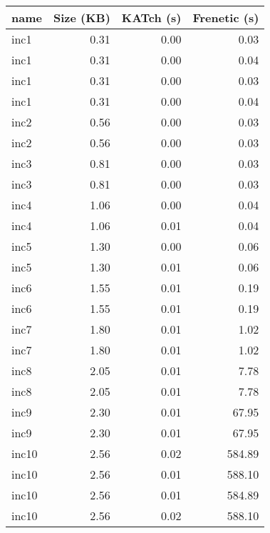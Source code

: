 \begin{tabular}{lrrr}
\toprule
name & Size (KB) & KATch (s) & Frenetic (s) \\
\midrule
inc1 & 0.31 & 0.00 & 0.03 \\
inc1 & 0.31 & 0.00 & 0.04 \\
inc1 & 0.31 & 0.00 & 0.03 \\
inc1 & 0.31 & 0.00 & 0.04 \\
inc2 & 0.56 & 0.00 & 0.03 \\
inc2 & 0.56 & 0.00 & 0.03 \\
inc3 & 0.81 & 0.00 & 0.03 \\
inc3 & 0.81 & 0.00 & 0.03 \\
inc4 & 1.06 & 0.00 & 0.04 \\
inc4 & 1.06 & 0.01 & 0.04 \\
inc5 & 1.30 & 0.00 & 0.06 \\
inc5 & 1.30 & 0.01 & 0.06 \\
inc6 & 1.55 & 0.01 & 0.19 \\
inc6 & 1.55 & 0.01 & 0.19 \\
inc7 & 1.80 & 0.01 & 1.02 \\
inc7 & 1.80 & 0.01 & 1.02 \\
inc8 & 2.05 & 0.01 & 7.78 \\
inc8 & 2.05 & 0.01 & 7.78 \\
inc9 & 2.30 & 0.01 & 67.95 \\
inc9 & 2.30 & 0.01 & 67.95 \\
inc10 & 2.56 & 0.02 & 584.89 \\
inc10 & 2.56 & 0.01 & 588.10 \\
inc10 & 2.56 & 0.01 & 584.89 \\
inc10 & 2.56 & 0.02 & 588.10 \\
\bottomrule
\end{tabular}
